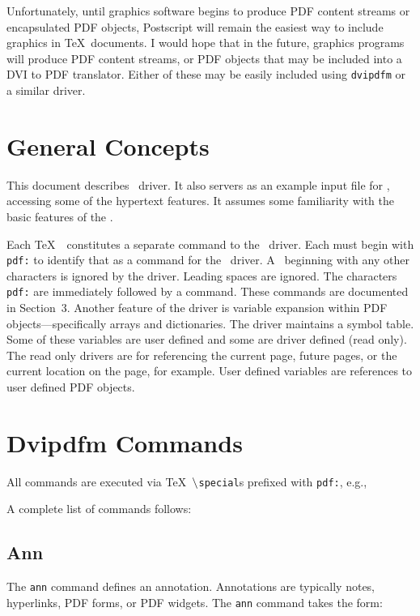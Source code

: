 Unfortunately, until graphics software
begins to produce PDF content streams or encapsulated
PDF objects, Postscript will remain the easiest
way to include graphics in \TeX\ documents.
I would hope that in the future, graphics programs
will produce PDF content streams, or PDF objects that
may be included into a DVI to PDF translator.  Either
of these may be easily included using {\tt dvipdfm}
or a similar driver.

\section{General Concepts}
This document describes \dvipdfm\ driver.
It also servers as an example input file for
\dvipdfm, accessing some of the hypertext
features.  It assumes some familiarity with the basic features
of the .

Each \TeX\ \ttspecial\ 
constitutes a separate command to the \dvipdfm\ 
driver.  Each \ttspecial must begin with {\tt pdf:}
to identify that \ttspecial as a command for the \dvipdfm\ driver.
A \ttspecial\ beginning with any other characters is ignored
by the driver.  Leading spaces are ignored.  The characters {\tt pdf:}
are immediately followed by a \dvipdfm command.  These commands
are documented in Section~3.  Another feature of the driver
is variable expansion within PDF objects---specifically arrays and
dictionaries.  The driver maintains a symbol table.
Some of these variables are user defined and some are
driver defined (read only).  The read only
drivers are for referencing the current page, future pages,
or the current location on the page, for example.
User defined variables are references to user defined PDF objects.


\section{Dvipdfm Commands}
All commands are executed via \TeX\ $\tt \backslash${\tt special}s
prefixed with {\tt pdf:}, e.g.,

\display{\tt pdf: out 1 << /Title (Introduction) /Dest [ 1 0 R /FitH 234 ] >>
}

A complete list of commands follows:

\subsection{Ann}
The {\tt ann} command defines an annotation.  Annotations are typically
notes, hyperlinks, PDF forms, or PDF widgets.  The {\tt ann} command
takes the form:

